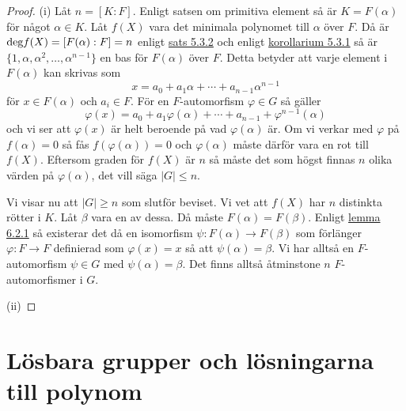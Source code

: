 \documentclass{article}
\newcommand{\grad}[0]{\textnormal{deg}}
\theoremstyle{definition}
\begin{document}
\begin{proof}
  (i) Låt $n = [K:F]$. Enligt satsen om primitiva element så är $K = F(\alpha)$ för något $\alpha \in K.$ Låt $f(X)$ vara det minimala polynomet 
  till $\alpha$ över $F$. Då är $\grad f(X) = [F(\alpha):F] = n$ enligt \hyperlink{5.3.2}{sats 5.3.2} och enligt \hyperlink{kol5.3.1}{korollarium 5.3.1} så är 
  $\{1, \alpha, \alpha^2, \ldots, \alpha^{n-1}\}$ en bas för $F(\alpha)$ över $F$. Detta betyder att varje element i 
  $F(\alpha)$ kan skrivas som 
  \[ x = a_0 + a_1 \alpha + \cdots + a_{n-1} \alpha^{n-1}\]
  för $x \in F(\alpha)$ och $a_i \in F$. För en $F$-automorfism $\varphi \in G$ så gäller 
  \[ \varphi(x) = a_0 + a_1 \varphi(\alpha) + \cdots + a_{n-1} + \varphi^{n-1}(\alpha)\]
  och vi ser att $\varphi(x)$ är helt beroende på vad $\varphi(\alpha)$ är. Om vi 
  verkar med $\varphi$ på $f(\alpha) = 0$ så fås $f(\varphi(\alpha)) = 0$ och $\varphi(\alpha)$ måste därför vara en rot till $f(X)$.
  Eftersom graden för $f(X)$ är $n$ så måste det som högst finnas $n$ olika värden på $\varphi(\alpha)$, det vill säga
  $|G| \leq n$.

  Vi visar nu att $|G| \geq n$ som slutför beviset. Vi vet att $f(X)$ har $n$ distinkta rötter i $K$. Låt $\beta$ vara en av dessa.
  Då måste $F(\alpha) = F(\beta)$. Enligt \hyperlink{6.0.2}{lemma 6.2.1} så existerar det då en isomorfism $\psi: F(\alpha) \rightarrow F(\beta)$
  som förlänger $\varphi: F \rightarrow F$ definierad som $\varphi(x) = x$ så att $\psi(\alpha) = \beta.$ Vi har alltså en $F$-automorfism $\psi \in G$
  med $\psi(\alpha) = \beta$. Det finns alltså åtminstone $n$ $F$-automorfismer i $G$. 

  (ii)
\end{proof}

\section{Lösbara grupper och lösningarna till polynom}
\end{document}
